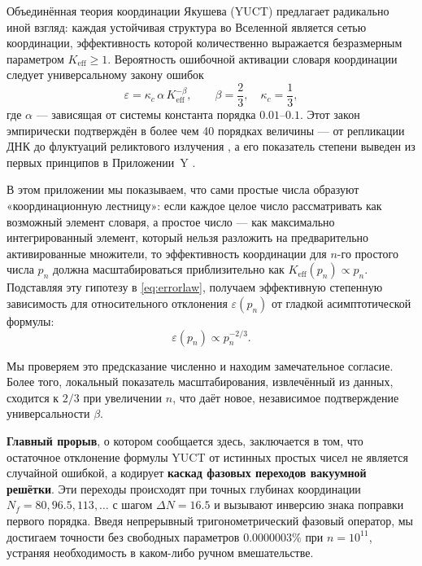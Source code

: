 \documentclass[12pt,a4paper]{article}
\newcommand{\kappac}{\kappa_c}
\begin{document}
	Объединённая теория координации Якушева (YUCT) предлагает радикально иной взгляд: каждая устойчивая структура во Вселенной является сетью координации, эффективность которой количественно выражается безразмерным параметром \(K_{\mathrm{eff}} \ge 1\). Вероятность ошибочной активации словаря координации следует универсальному закону ошибок
	\begin{equation}\label{eq:errorlaw}
		\varepsilon = \kappac \, \alpha \, K_{\mathrm{eff}}^{-\beta}, \qquad \beta = \frac{2}{3},\quad \kappac = \frac{1}{3},
	\end{equation}
	где \(\alpha\) — зависящая от системы константа порядка \(0.01\)–\(0.1\). Этот закон эмпирически подтверждён в более чем 40 порядках величины — от репликации ДНК до флуктуаций реликтового излучения \cite{AppendixL}, а его показатель степени выведен из первых принципов в Приложении~Y \cite{AppendixY}.
	
	В этом приложении мы показываем, что сами простые числа образуют «координационную лестницу»: если каждое целое число рассматривать как возможный элемент словаря, а простое число — как максимально интегрированный элемент, который нельзя разложить на предварительно активированные множители, то эффективность координации для \(n\)-го простого числа \(p_n\) должна масштабироваться приблизительно как \(K_{\mathrm{eff}}(p_n) \propto p_n\). Подставляя эту гипотезу в \eqref{eq:errorlaw}, получаем эффективную степенную зависимость для относительного отклонения \(\varepsilon(p_n)\) от гладкой асимптотической формулы:
	\[
	\varepsilon(p_n) \propto p_n^{-2/3}.
	\]
	
	Мы проверяем это предсказание численно и находим замечательное согласие. Более того, локальный показатель масштабирования, извлечённый из данных, сходится к \(2/3\) при увеличении \(n\), что даёт новое, независимое подтверждение универсальности \(\beta\).
	
	\textbf{Главный прорыв}, о котором сообщается здесь, заключается в том, что остаточное отклонение формулы YUCT от истинных простых чисел не является случайной ошибкой, а кодирует \textbf{каскад фазовых переходов вакуумной решётки}. Эти переходы происходят при точных глубинах координации \(N_f = 80, 96.5, 113, \dots\) с шагом \(\Delta N = 16.5\) и вызывают инверсию знака поправки первого порядка. Введя непрерывный тригонометрический фазовый оператор, мы достигаем точности без свободных параметров \(0.0000003\%\) при \(n=10^{11}\), устраняя необходимость в каком-либо ручном вмешательстве.
	
\end{document}
